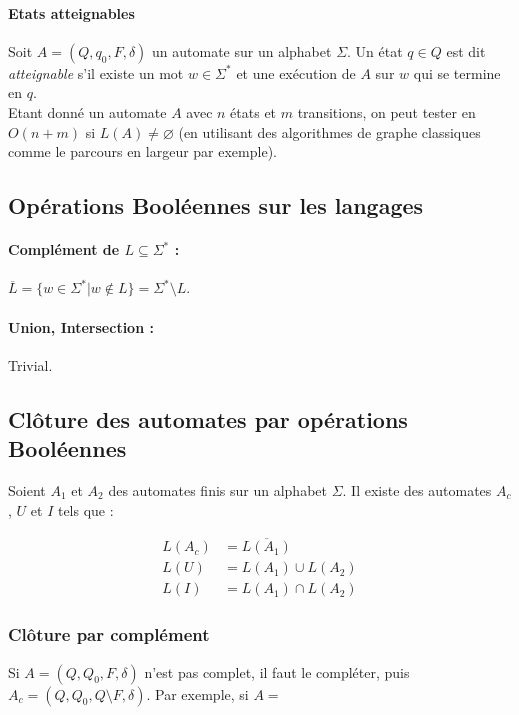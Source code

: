 \documentclass[a4paper]{article}
\begin{document}
  \paragraph{Etats atteignables} Soit $A = (Q, q_0, F, \delta)$ un automate sur un
  alphabet $\Sigma$. Un état $q\in Q$ est dit \textit{atteignable} s'il existe
  un mot $w \in \Sigma^*$ et une exécution de $A$ sur $w$ qui se termine en $q$.\\

  Etant donné un automate $A$ avec $n$ états et $m$ transitions, on peut tester
  en $O(n+m)$ si $L(A) \neq \varnothing$ (en utilisant des algorithmes de graphe
  classiques comme le parcours en largeur par exemple).

  \subsection{Opérations Booléennes sur les langages}
  \paragraph{Complément de $L \subseteq \Sigma^*$ :} $\overline{L} = \{ w \in \Sigma^* | w \not \in L\} = \Sigma^* \setminus L$.

  \paragraph{Union, Intersection :} Trivial.

  \subsection{Clôture des automates par opérations Booléennes}
  Soient $A_1$ et $A_2$ des automates finis sur un alphabet $\Sigma$. Il existe
  des automates $A_c$, $U$ et $I$ tels que :
  \begin{center}
    \begin{align*}
      L(A_c) & = \overline{L(A_1)}\\
      L(U) & = L(A_1) \cup L(A_2)\\
      L(I) & = L(A_1) \cap L(A_2)
    \end{align*}
  \end{center}

  \subsubsection{Clôture par complément}
  Si $A = (Q, Q_0, F, \delta)$ n'est pas complet, il faut le compléter, puis
  $A_c = (Q, Q_0, Q \setminus F, \delta)$. Par exemple, si $A = $
\end{document}
